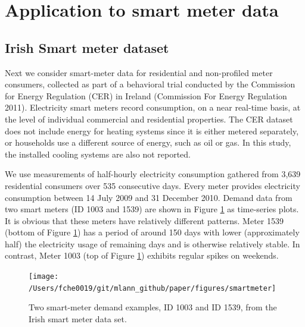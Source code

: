 \documentclass[12pt]{article}
\begin{document}
\hypertarget{smartmeter}{%
\section{Application to smart meter data}\label{smartmeter}}

\hypertarget{irish-smart-meter-dataset}{%
\subsection{Irish Smart meter dataset}\label{irish-smart-meter-dataset}}

Next we consider smart-meter data for residential and non-profiled meter consumers, collected as part of a behavioral trial conducted by the Commission for Energy Regulation (CER) in Ireland (Commission For Energy Regulation 2011). Electricity smart meters record consumption, on a near real-time basis, at the level of individual commercial and residential properties. The CER dataset does not include energy for heating systems since it is either metered separately, or households use a different source of energy, such as oil or gas. In this study, the installed cooling systems are also not reported.

We use measurements of half-hourly electricity consumption gathered from 3,639 residential consumers over 535 consecutive days. Every meter provides electricity consumption between 14 July 2009 and 31 December 2010. Demand data from two smart meters (ID 1003 and 1539) are shown in Figure \ref{fig:smartmeter} as time-series plots. It is obvious that these meters have relatively different patterns. Meter 1539 (bottom of Figure \ref{fig:smartmeter}) has a period of around 150 days with lower (approximately half) the electricity usage of remaining days and is otherwise relatively stable. In contrast, Meter 1003 (top of Figure \ref{fig:smartmeter}) exhibits regular spikes on weekends.

\begin{figure}

{\centering \texttt{[image: /Users/fche0019/git/mlann\_github/paper/figures/smartmeter]} 

}

\caption{Two smart-meter demand examples, ID 1003 and ID 1539, from the Irish smart meter data set.}\label{fig:smartmeter}
\end{figure}
\end{document}
